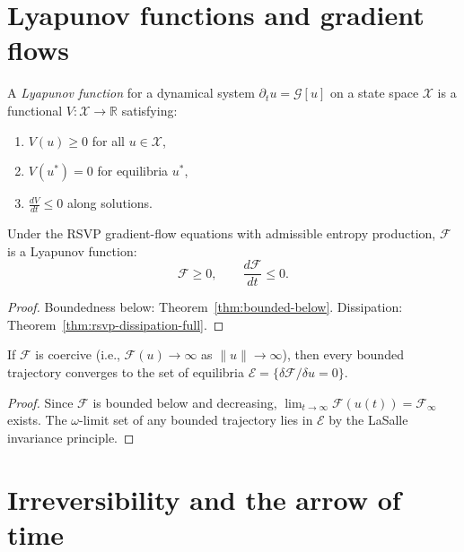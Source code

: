 \section{Lyapunov functions and gradient flows}

\begin{definition}
  \label{def:lyapunov}
  A \emph{Lyapunov function} for a dynamical system
  $\partial_t u = \mathcal{G}[u]$ on a state space $\mathcal{X}$
  is a functional $V : \mathcal{X} \to \mathbb{R}$ satisfying:
  \begin{enumerate}[leftmargin=2em]
    \item $V(u) \geq 0$ for all $u \in \mathcal{X}$,
    \item $V(u^*) = 0$ for equilibria $u^*$,
    \item $\frac{dV}{dt} \leq 0$ along solutions.
  \end{enumerate}
\end{definition}

\begin{theorem}
  \label{thm:lyapunov}
  \statusproven{}
  Under the RSVP gradient-flow equations with admissible
  entropy production, $\mathcal{F}$ is a Lyapunov function:
  \[
    \mathcal{F} \geq 0,
    \qquad
    \frac{d\mathcal{F}}{dt} \leq 0.
  \]
\end{theorem}

\begin{proof}
  Boundedness below: Theorem~\ref{thm:bounded-below}.
  Dissipation: Theorem~\ref{thm:rsvp-dissipation-full}.
\end{proof}

\begin{corollary}
  \label{cor:attractor}
  \statusproven{}
  If $\mathcal{F}$ is coercive (i.e., $\mathcal{F}(u) \to \infty$
  as $\|u\| \to \infty$), then every bounded trajectory
  converges to the set of equilibria
  $\mathcal{E} = \{\delta\mathcal{F}/\delta u = 0\}$.
\end{corollary}

\begin{proof}
  Since $\mathcal{F}$ is bounded below and decreasing,
  $\lim_{t\to\infty}\mathcal{F}(u(t)) = \mathcal{F}_\infty$
  exists.
  The $\omega$-limit set of any bounded trajectory lies in
  $\mathcal{E}$ by the LaSalle invariance principle.
\end{proof}

\section{Irreversibility and the arrow of time}

